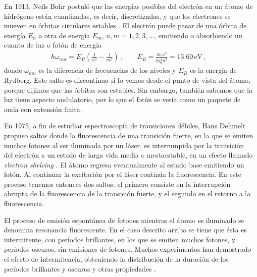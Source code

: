 \documentclass[superscriptaddress,12pt,amsmath]{revtex4-2}
\begin{document}
En 1913, Neils Bohr postul\'o que las energ\'ias posibles del electr\'on en 
un \'atomo de hidr\'ogeno est\'an cuantizadas, es decir, discretizadas, y 
que los electrones se mueven en \'orbitas circulares estables \cite{Bohr13}. 
El electr\'on puede pasar de una \'orbita de energ\'ia $E_n$ a otra de 
energ\'ia $E_m$, $n,m =1,2,3,\ldots$, emitiendo o absorbiendo un cuanto 
de luz o fot\'on de energ\'ia 
%
\begin{eqnarray} 		%
\hbar \omega_{nm} = E_R \left( \frac{1}{n^2} -  \frac{1}{m^2} \right) \,, 
	\qquad 
E_R = \frac{m_e e^4}{8 \epsilon_0^2 h^2 } = 13.60 \,\mathrm{eV} 	\,,
\end{eqnarray}
donde $\omega_{mn}$ es la diferencia de frecuencias de los niveles y 
$E_R$ es la energía de Rydberg. Este salto es discontinuo si lo vemos 
desde el punto de vista del átomo, porque dijimos que las órbitas son 
estables. Sin embargo, también sabemos que la luz tiene aspecto 
ondulatorio, por lo que el fotón se vería como un paquete de onda con 
extensión finita. 

En 1975, a fin de estudiar espectroscopía de transiciones débiles, Hans 
Dehmelt \cite{Dehmelt75} propuso saltos donde la fluorescencia de una 
transici\'on fuerte, en la que se emiten muchos fotones al ser iluminada 
por un l\'aser, es interrumpida por la transición del electrón a un estado 
de larga vida media o mestaestable, en un efecto llamado \textit{electron 
shelving} \cite{NaSD86}. El átomo regresa eventualmente al estado base 
emitiendo un fotón. Al continuar la excitaci\'on por el l\'aser contin\'ua la 
fluorescencia. En este proceso tenemos entonces dos saltos: el primero 
consiste en la interrupción abrupta de la fluorescencia de la transición 
fuerte, y el segundo en el retorno a la fluorescencia. 

El proceso de emisi\'on espont\'anea de fotones mientras el \'atomo es 
iluminado se denomina resonancia fluorescente. En el caso descrito 
arriba se tiene que \'esta es intermitente, con per\'iodos brillantes, en los 
que se emiten muchos fotones, y per\'iodos oscuros, sin emisiones de 
fotones. Muchos experimentos han demostrado el efecto de intermitencia, 
obteniendo la distribuci\'on de la duraci\'on de los per\'iodos brillantes y 
oscuros y otras propiedades 
\cite{NaSD86,SNBT86,BHIW86,PlKn98,BuTa00}. 
\end{document}
